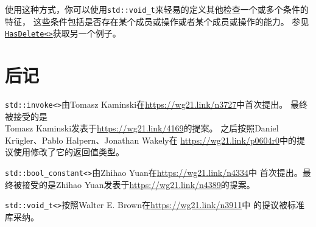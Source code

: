 使用这种方式，你可以使用\texttt{std::void\_t}来轻易的定义其他检查一个或多个条件的特征，
这些条件包括是否存在某个成员或操作或者某个成员或操作的能力。
参见\hyperref[ch30.1.2.2]{\texttt{HasDelete<>}}获取另一个例子。


\section{后记}
\texttt{std::invoke<>}由Tomasz Kaminski在\url{https://wg21.link/n3727}中首次提出。
最终被接受的是\\
Tomasz Kaminski发表于\url{https://wg21.link/4169}的提案。
之后按照Daniel Krügler、Pablo Halpern、Jonathan Wakely在
\url{https://wg21.link/p0604r0}中的提议使用修改了它的返回值类型。

\texttt{std::bool\_constant<>}由Zhihao Yuan在\url{https://wg21.link/n4334}中
首次提出。最终被接受的是Zhihao Yuan发表于\url{https://wg21.link/n4389}的提案。

\texttt{std::void\_t<>}按照Walter E. Brown在\url{https://wg21.link/n3911}中
的提议被标准库采纳。